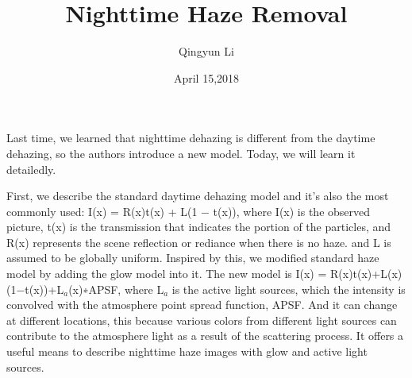 \documentclass{article}
\author{Qingyun Li}
\date{April 15,2018}
\title{Nighttime Haze Removal}
\begin{document}
\maketitle
\par Last time, we learned that nighttime dehazing is different from the daytime dehazing, so the authors introduce a new model. Today, we will learn it detailedly.
\par First, we describe the standard daytime dehazing model and it's also the most commonly used: I(x) = R(x)t(x) + L(1 − t(x)), where I(x) is the observed picture, t(x) is the transmission that indicates the portion of the particles, and R(x) represents the scene reflection or rediance when there is no haze. and L is assumed to be globally uniform. Inspired by this, we modified standard haze model by adding the glow model into it. The new model is I(x) = R(x)t(x)+L(x)(1−t(x))+L$ _a $(x)∗APSF, where L$ _a $ is the active light sources, which the intensity is convolved with the atmosphere point spread function, APSF. And it can change at different locations, this because various colors from different light sources can contribute to the atmosphere light as a result of the scattering process. It offers a useful means to describe nighttime haze images with glow and active light sources.
\end{document}
